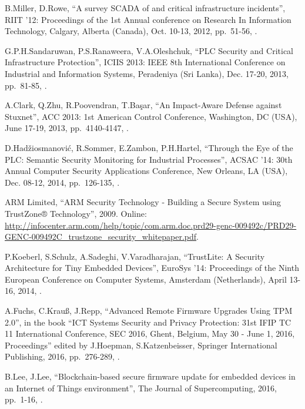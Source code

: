 \begin{thebibliography}{99}
B.Miller, D.Rowe,
``A survey SCADA of and critical infrastructure incidents'',
RIIT '12: Proceedings of the 1st Annual conference on Research In Information Technology,
Calgary, Alberta (Canada), Oct. 10-13, 2012,
pp.\ 51-56,
.

G.P.H.Sandaruwan, P.S.Ranaweera, V.A.Oleshchuk,
``PLC Security and Critical Infrastructure Protection'',
ICIIS 2013: IEEE 8th International Conference on Industrial and Information Systems,
Peradeniya (Sri Lanka), Dec. 17-20, 2013,
pp.\ 81-85,
.

A.Clark, Q.Zhu, R.Poovendran, T.Başar,
``An Impact-Aware Defense against Stuxnet'',
ACC 2013: 1st American Control Conference,
Washington, DC (USA), June 17-19, 2013,
pp.\ 4140-4147,
.

D.Hadžiosmanović, R.Sommer, E.Zambon, P.H.Hartel,
``Through the Eye of the PLC: Semantic Security Monitoring for Industrial Processes'',
ACSAC '14: 30th Annual Computer Security Applications Conference,
New Orleans, LA (USA), Dec. 08-12, 2014,
pp.\ 126-135,
.

ARM Limited,
``ARM Security Technology - Building a Secure System using TrustZone® Technology'',
2009.
Online: \url{http://infocenter.arm.com/help/topic/com.arm.doc.prd29-genc-009492c/PRD29-GENC-009492C_trustzone_security_whitepaper.pdf}.

P.Koeberl, S.Schulz, A.Sadeghi, V.Varadharajan,
``TrustLite: A Security Architecture for Tiny Embedded Devices'',
EuroSys '14: Proceedings of the Ninth European Conference on Computer Systems,
Amsterdam (Netherlands), April 13-16, 2014,
.

A.Fuchs, C.Krau{\ss}, J.Repp,
``Advanced Remote Firmware Upgrades Using TPM 2.0'',
in the book ``ICT Systems Security and Privacy Protection: 31st IFIP TC 11 International Conference, SEC 2016, Ghent, Belgium, May 30 - June 1, 2016, Proceedings''
edited by J.Hoepman, S.Katzenbeisser,
Springer International Publishing, 2016,
pp.\ 276-289,
.

B.Lee, J.Lee,
``Blockchain-based secure firmware update for embedded devices in an Internet of Things environment'',
The Journal of Supercomputing, 2016,
pp.\ 1-16,
.


\end{thebibliography}
